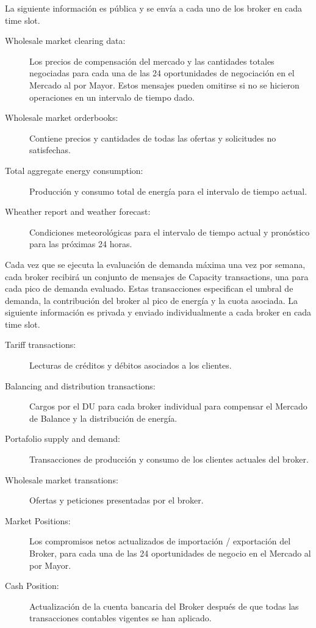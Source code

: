 La siguiente información es pública y se envía a cada uno de los broker en cada time slot.
\begin{description}
	\item [Wholesale market clearing data: ]Los precios de compensación del mercado y las cantidades totales negociadas para cada una de las 24 oportunidades de negociación en el Mercado al por Mayor. Estos mensajes pueden omitirse si no se hicieron operaciones en un intervalo de tiempo dado.
	\item [Wholesale market orderbooks: ]Contiene precios y cantidades de todas las ofertas y solicitudes no satisfechas.
	\item [Total aggregate energy consumption: ]Producción y consumo total de energía para el intervalo de tiempo actual.
	\item [Wheather report and weather forecast:] Condiciones meteorológicas para el intervalo de tiempo actual y pronóstico para las próximas 24 horas.
\end{description}
Cada vez que se ejecuta la evaluación de demanda máxima una vez por semana, cada broker recibirá un conjunto de mensajes de Capacity transactions, una para cada pico de demanda evaluado. Estas transacciones especifican el umbral de demanda, la contribución del broker al pico de energía y la cuota asociada. La siguiente información es privada y enviado individualmente a cada broker en cada time slot.
\begin{description}
	\item [Tariff transactions:] Lecturas de créditos y débitos asociados a los clientes.
	\item [Balancing and distribution transactions:] Cargos por el DU para cada broker individual para compensar el Mercado de Balance y la distribución de energía.
	\item [Portafolio supply and demand:] Transacciones de producción y consumo de los clientes actuales del broker.
	\item [Wholesale market transations:] Ofertas y peticiones presentadas por el broker.
	\item [Market Positions:] Los compromisos netos actualizados de importación / exportación del Broker, para cada una de las 24 oportunidades de negocio en el Mercado al por Mayor.
	\item [Cash Position: ]Actualización de la cuenta bancaria del Broker después de que todas las transacciones contables vigentes se han aplicado.
\end{description}


